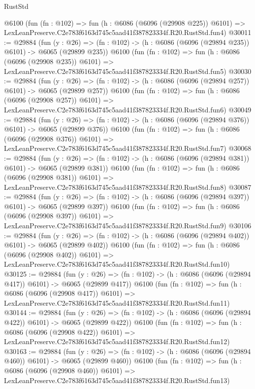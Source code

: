 \begin{lexlean}{RustStd}
\begin{coremodule}
    @6100
    (fun (fn : @102) =>
    fun (h : @6086 (@6096 (@29908 @225)) @6101) =>
    LexLeanPreserve.C2e783f6163d745c5aad41f387823334f.R20.RustStd.fun4)
@30011 := @29884
    (fun (y : @26) => (fn : @102) -> (h : @6086 (@6096 (@29894 @235)) @6101) -> @6065 (@29899 @235))
    @6100
    (fun (fn : @102) =>
    fun (h : @6086 (@6096 (@29908 @235)) @6101) =>
    LexLeanPreserve.C2e783f6163d745c5aad41f387823334f.R20.RustStd.fun5)
@30030 := @29884
    (fun (y : @26) => (fn : @102) -> (h : @6086 (@6096 (@29894 @257)) @6101) -> @6065 (@29899 @257))
    @6100
    (fun (fn : @102) =>
    fun (h : @6086 (@6096 (@29908 @257)) @6101) =>
    LexLeanPreserve.C2e783f6163d745c5aad41f387823334f.R20.RustStd.fun6)
@30049 := @29884
    (fun (y : @26) => (fn : @102) -> (h : @6086 (@6096 (@29894 @376)) @6101) -> @6065 (@29899 @376))
    @6100
    (fun (fn : @102) =>
    fun (h : @6086 (@6096 (@29908 @376)) @6101) =>
    LexLeanPreserve.C2e783f6163d745c5aad41f387823334f.R20.RustStd.fun7)
@30068 := @29884
    (fun (y : @26) => (fn : @102) -> (h : @6086 (@6096 (@29894 @381)) @6101) -> @6065 (@29899 @381))
    @6100
    (fun (fn : @102) =>
    fun (h : @6086 (@6096 (@29908 @381)) @6101) =>
    LexLeanPreserve.C2e783f6163d745c5aad41f387823334f.R20.RustStd.fun8)
@30087 := @29884
    (fun (y : @26) => (fn : @102) -> (h : @6086 (@6096 (@29894 @397)) @6101) -> @6065 (@29899 @397))
    @6100
    (fun (fn : @102) =>
    fun (h : @6086 (@6096 (@29908 @397)) @6101) =>
    LexLeanPreserve.C2e783f6163d745c5aad41f387823334f.R20.RustStd.fun9)
@30106 := @29884
    (fun (y : @26) => (fn : @102) -> (h : @6086 (@6096 (@29894 @402)) @6101) -> @6065 (@29899 @402))
    @6100
    (fun (fn : @102) =>
    fun (h : @6086 (@6096 (@29908 @402)) @6101) =>
    LexLeanPreserve.C2e783f6163d745c5aad41f387823334f.R20.RustStd.fun10)
@30125 := @29884
    (fun (y : @26) => (fn : @102) -> (h : @6086 (@6096 (@29894 @417)) @6101) -> @6065 (@29899 @417))
    @6100
    (fun (fn : @102) =>
    fun (h : @6086 (@6096 (@29908 @417)) @6101) =>
    LexLeanPreserve.C2e783f6163d745c5aad41f387823334f.R20.RustStd.fun11)
@30144 := @29884
    (fun (y : @26) => (fn : @102) -> (h : @6086 (@6096 (@29894 @422)) @6101) -> @6065 (@29899 @422))
    @6100
    (fun (fn : @102) =>
    fun (h : @6086 (@6096 (@29908 @422)) @6101) =>
    LexLeanPreserve.C2e783f6163d745c5aad41f387823334f.R20.RustStd.fun12)
@30163 := @29884
    (fun (y : @26) => (fn : @102) -> (h : @6086 (@6096 (@29894 @460)) @6101) -> @6065 (@29899 @460))
    @6100
    (fun (fn : @102) =>
    fun (h : @6086 (@6096 (@29908 @460)) @6101) =>
    LexLeanPreserve.C2e783f6163d745c5aad41f387823334f.R20.RustStd.fun13)

\end{coremodule}
\end{lexlean}
